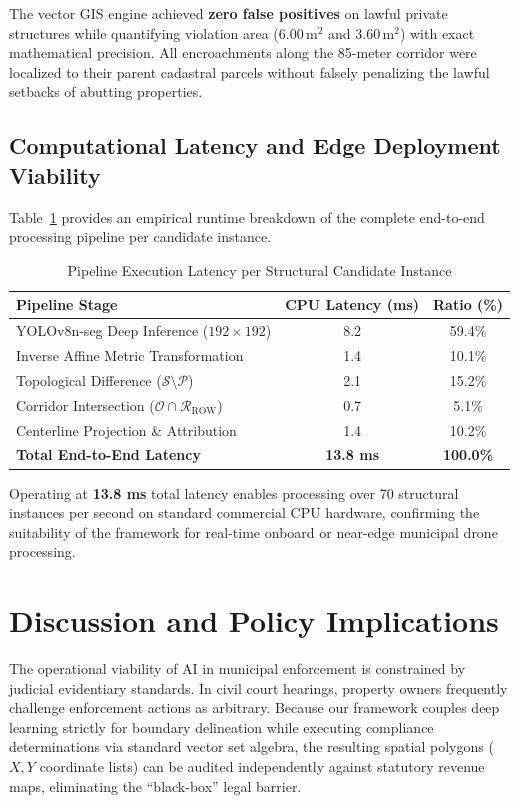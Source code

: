 \documentclass[conference]{IEEEtran}
\begin{document}
The vector GIS engine achieved \textbf{zero false positives} on lawful private structures while quantifying violation area ($6.00\,\text{m}^2$ and $3.60\,\text{m}^2$) with exact mathematical precision. All encroachments along the 85-meter corridor were localized to their parent cadastral parcels without falsely penalizing the lawful setbacks of abutting properties.

\subsection{Computational Latency and Edge Deployment Viability}
Table~\ref{tab:latency} provides an empirical runtime breakdown of the complete end-to-end processing pipeline per candidate instance.

\begin{table}[!t]
\caption{Pipeline Execution Latency per Structural Candidate Instance}
\label{tab:latency}
\centering
\footnotesize
\renewcommand{\arraystretch}{1.25}
\begin{tabular}{lcc}
\toprule
\textbf{Pipeline Stage} & \textbf{CPU Latency (ms)} & \textbf{Ratio (\%)} \\
\midrule
YOLOv8n-seg Deep Inference ($192 \times 192$) & 8.2 & 59.4\% \\
Inverse Affine Metric Transformation & 1.4 & 10.1\% \\
Topological Difference ($\mathcal{S} \setminus \mathcal{P}$) & 2.1 & 15.2\% \\
Corridor Intersection ($\mathcal{O} \cap \mathcal{R}_{\text{ROW}}$) & 0.7 & 5.1\% \\
Centerline Projection \& Attribution & 1.4 & 10.2\% \\
\midrule
\textbf{Total End-to-End Latency} & \textbf{13.8 ms} & \textbf{100.0\%} \\
\bottomrule
\end{tabular}
\end{table}

Operating at \textbf{13.8 ms} total latency enables processing over 70 structural instances per second on standard commercial CPU hardware, confirming the suitability of the framework for real-time onboard or near-edge municipal drone processing.

\section{Discussion and Policy Implications}
The operational viability of AI in municipal enforcement is constrained by judicial evidentiary standards. In civil court hearings, property owners frequently challenge enforcement actions as arbitrary. Because our framework couples deep learning strictly for boundary delineation while executing compliance determinations via standard vector set algebra, the resulting spatial polygons ($X, Y$ coordinate lists) can be audited independently against statutory revenue maps, eliminating the ``black-box'' legal barrier.
\end{document}
